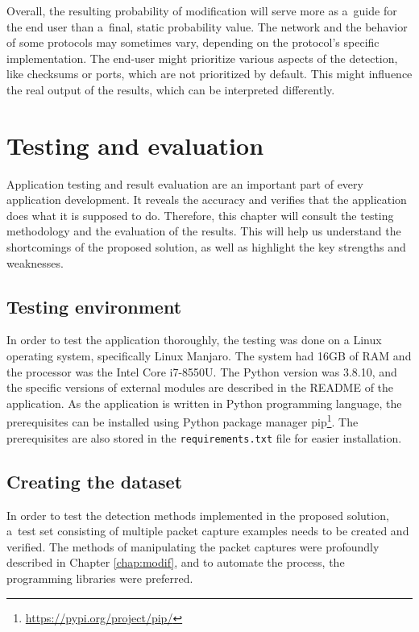 \documentclass[
  printed,     %
  color,       %
  oneside,     %
  nosansbold,  %
  nocolorbold, %
  nolof,         %
  nolot,         %
]{fithesis4}
\begin{document}
Overall, the resulting probability of modification will serve more as a~guide for the end user than a~final, static probability value. The network and the behavior of some protocols may sometimes vary, depending on the protocol's specific implementation. The end-user might prioritize various aspects of the detection, like checksums or ports, which are not prioritized by default. This might influence the real output of the results, which can be interpreted differently.


\newpage
\chapter{Testing and evaluation}
\label{chap:testing}

Application testing and result evaluation are an important part of every application development. It reveals the accuracy and verifies that the application does what it is supposed to do. Therefore, this chapter will consult the testing methodology and the evaluation of the results. This will help us understand the shortcomings of the proposed solution, as well as highlight the key strengths and weaknesses.

\section{Testing environment}

In order to test the application thoroughly, the testing was done on a Linux operating system, specifically Linux Manjaro. The system had 16GB of RAM and the processor was the Intel Core i7-8550U. The Python version was 3.8.10, and the specific versions of external modules are described in the README of the application. As the application is written in Python programming language, the prerequisites can be installed using Python package manager pip\footnote{\url{https://pypi.org/project/pip/}}. The prerequisites are also stored in the \texttt{requirements.txt} file for easier installation.

\section{Creating the dataset}

In order to test the detection methods implemented in the proposed solution, a~test set consisting of multiple packet capture examples needs to be created and verified. The methods of manipulating the packet captures were profoundly described in Chapter \ref{chap:modif}, and to automate the process, the programming libraries were preferred.
\end{document}
